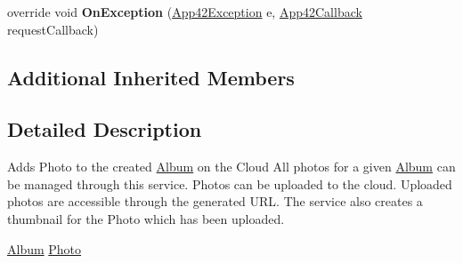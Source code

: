 \begin{DoxyCompactItemize}
\item 
\hypertarget{classcom_1_1shephertz_1_1app42_1_1paas_1_1sdk_1_1windows_1_1gallery_1_1_photo_service_a5efceaa9b0c15c85e0a18575a91c32c5}{override void {\bfseries On\+Exception} (\hyperlink{classcom_1_1shephertz_1_1app42_1_1paas_1_1sdk_1_1windows_1_1_app42_exception}{App42\+Exception} e, \hyperlink{interfacecom_1_1shephertz_1_1app42_1_1paas_1_1sdk_1_1windows_1_1_app42_callback}{App42\+Callback} request\+Callback)}\label{classcom_1_1shephertz_1_1app42_1_1paas_1_1sdk_1_1windows_1_1gallery_1_1_photo_service_a5efceaa9b0c15c85e0a18575a91c32c5}

\end{DoxyCompactItemize}
\subsection*{Additional Inherited Members}


\subsection{Detailed Description}
Adds Photo to the created \hyperlink{classcom_1_1shephertz_1_1app42_1_1paas_1_1sdk_1_1windows_1_1gallery_1_1_album}{Album} on the Cloud All photos for a given \hyperlink{classcom_1_1shephertz_1_1app42_1_1paas_1_1sdk_1_1windows_1_1gallery_1_1_album}{Album} can be managed through this service. Photos can be uploaded to the cloud. Uploaded photos are accessible through the generated U\+R\+L. The service also creates a thumbnail for the Photo which has been uploaded. 

\hyperlink{classcom_1_1shephertz_1_1app42_1_1paas_1_1sdk_1_1windows_1_1gallery_1_1_photo_service}{Album} \hyperlink{classcom_1_1shephertz_1_1app42_1_1paas_1_1sdk_1_1windows_1_1gallery_1_1_photo_service}{Photo} 

